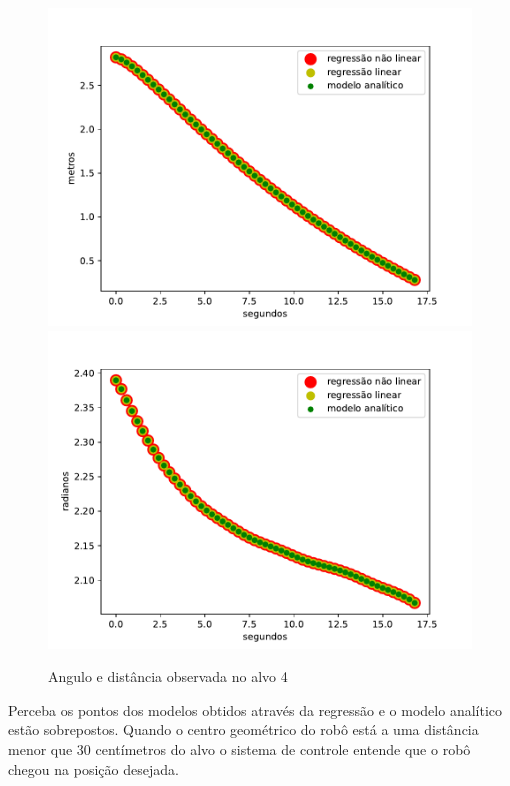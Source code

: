 \begin{figure}[H]
    \centering
    \includegraphics[scale=0.45]{figuras/distance_over_time_4.pdf}
    \includegraphics[scale=0.45]{figuras/angle_over_time_4.pdf}
    \caption{Angulo e distância observada no alvo 4}
\end{figure}

Perceba os pontos dos modelos obtidos através da regressão e o modelo analítico
estão sobrepostos. Quando o centro geométrico do robô está a uma distância menor que 30 centímetros
do alvo o sistema de controle entende que o robô chegou na posição desejada.

